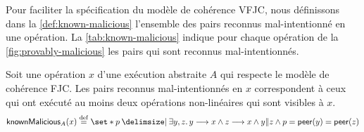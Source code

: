 %
%

Pour faciliter la spécification du modèle de cohérence \ac{VFJC}, nous définissons dans la \autoref{def:known-malicious} l'ensemble des pairs reconnus mal-intentionné en une opération.
La \autoref{tab:known-malicious} indique pour chaque opération de la \autoref{fig:provably-malicious} les pairs qui sont reconnus mal-intentionnés.

\begin{definition}\label{def:known-malicious}
  Soit une opération $x$ d'une exécution abstraite $A$ qui respecte le modèle de cohérence \acl{FJC}.
  Les pairs reconnus mal-intentionnés en $x$ correspondent à ceux qui ont exécuté au moins deux opérations non-linéaires qui sont visibles à $x$.
  \begin{equation*}
      \trm{knownMalicious}_A(x) \defeq \set*{p \given \exists y, z \qsep y \pre x \land z \pre x \land y \concur z \land p = \trm{peer}(y) = \trm{peer}(z)}
  \end{equation*}
\end{definition}

